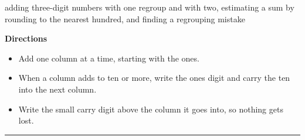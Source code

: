 \documentclass[12pt]{article}
\begin{document}

\begin{center}
\small adding three-digit numbers with one regroup and with two, estimating a sum by rounding to the nearest hundred, and finding a regrouping mistake
\end{center}

\noindent\textbf{Directions}
\begin{itemize}[leftmargin=1.1cm, itemsep=1pt, topsep=2pt]
  \item Add one column at a time, starting with the ones.
  \item When a column adds to ten or more, write the ones digit and carry the ten into the next column.
  \item Write the small carry digit above the column it goes into, so nothing gets lost.
\end{itemize}

\vspace{0.15cm}
\noindent\rule{\linewidth}{0.4pt}


\end{document}
